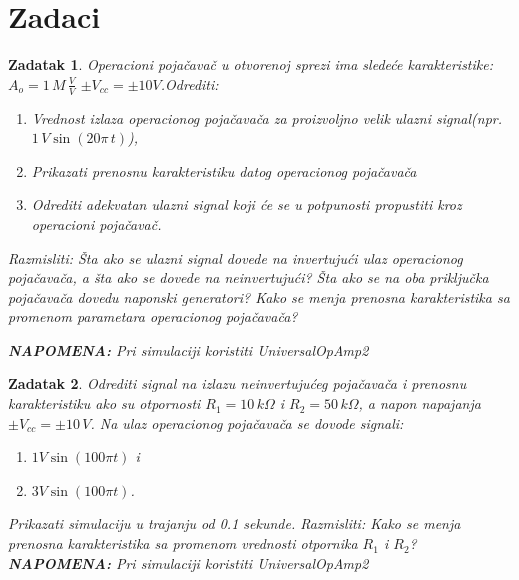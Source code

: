 \newpage
\section{Zadaci}

\newtheorem{zadatak}{Zadatak}

\begin{zadatak}
    Operacioni pojačavač u otvorenoj sprezi ima sledeće karakteristike: $A_o = 1\,M\,\frac{V}{V}$  $\pm V_{cc} = \pm 10V$.Odrediti:

    \begin{enumerate}
        \item[a)] Vrednost izlaza operacionog pojačavača za proizvoljno velik ulazni signal\newline (npr. $1\,V \sin(20\pi\,t)$),
        \item[b)] Prikazati prenosnu karakteristiku datog operacionog pojačavača 
        \item[c)] Odrediti adekvatan ulazni signal koji će se u potpunosti propustiti kroz operacioni pojačavač.
    \end{enumerate}

    Razmisliti: Šta ako se ulazni signal dovede na invertujući ulaz operacionog pojačavača, a šta ako se dovede na neinvertujući? Šta ako se na oba priključka pojačavača dovedu naponski generatori? Kako se menja prenosna karakteristika sa promenom parametara operacionog pojačavača?

    \textbf{NAPOMENA:} Pri simulaciji koristiti UniversalOpAmp2
\end{zadatak}

\begin{zadatak}
    Odrediti signal na izlazu neinvertujućeg pojačavača i prenosnu karakteristiku ako su otpornosti $R_1 = 10 \,k\Omega$ i $R_2 = 50 \,k\Omega$, a napon napajanja $\pm V_{cc} = \pm 10\,V$. Na ulaz operacionog pojačavača se dovode signali:
    \begin{enumerate}
        \item[a)] $1V\sin{(100 \pi t)}$ i
        
        \item[b)] $3V\sin{(100 \pi t)}$.
    \end{enumerate}
    Prikazati simulaciju u trajanju od 0.1 sekunde.
    \newline
    Razmisliti: Kako se menja prenosna karakteristika sa promenom vrednosti otpornika $R_1$ i $R_2$?
    \newline
    \textbf{NAPOMENA:} Pri simulaciji koristiti UniversalOpAmp2
\end{zadatak}

